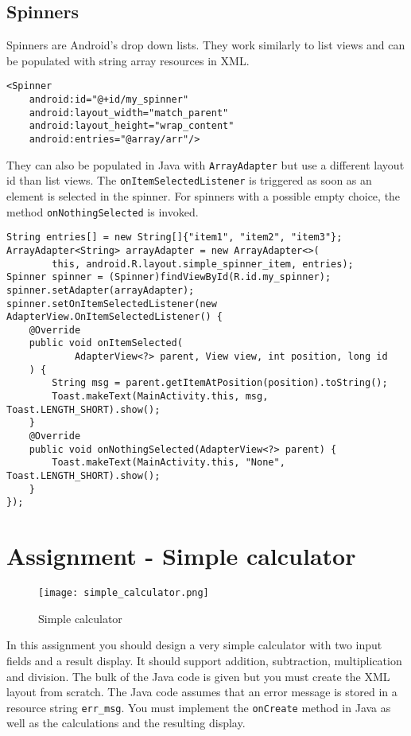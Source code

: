 \subsection{Spinners}
Spinners are Android's drop down lists. They work similarly to list views and can be populated with string array resources in XML.

\begin{lstlisting}[style=A_XML, caption={Spinner declaration}, label={listing:spinxml}]
<Spinner
    android:id="@+id/my_spinner"
    android:layout_width="match_parent"
    android:layout_height="wrap_content"
    android:entries="@array/arr"/>
\end{lstlisting}

They can also be populated in Java with \texttt{ArrayAdapter} but use a different layout id than list views. The \texttt{onItemSelectedListener} is triggered as soon as an element is selected in the spinner. For spinners with a possible empty choice, the method \texttt{onNothingSelected} is invoked.

\begin{lstlisting}[style=A_Java, caption={Spinner population and event}, label={listing:spinpopev}]
String entries[] = new String[]{"item1", "item2", "item3"};
ArrayAdapter<String> arrayAdapter = new ArrayAdapter<>(
        this, android.R.layout.simple_spinner_item, entries);
Spinner spinner = (Spinner)findViewById(R.id.my_spinner);
spinner.setAdapter(arrayAdapter);
spinner.setOnItemSelectedListener(new AdapterView.OnItemSelectedListener() {
    @Override
    public void onItemSelected(
            AdapterView<?> parent, View view, int position, long id
    ) {
        String msg = parent.getItemAtPosition(position).toString();
        Toast.makeText(MainActivity.this, msg, Toast.LENGTH_SHORT).show();
    }
    @Override
    public void onNothingSelected(AdapterView<?> parent) {
        Toast.makeText(MainActivity.this, "None", Toast.LENGTH_SHORT).show();
    }
});
\end{lstlisting}


\section{Assignment - Simple calculator}
\begin{minipage}{0.45\textwidth}
\begin{figure}[H]
\centering
\texttt{[image: simple\_calculator.png]}
\caption{Simple calculator}
\label{fig:simcal}
\end{figure}
\end{minipage}
\hfill
\begin{minipage}{0.475\textwidth}
In this assignment you should design a very simple calculator with two input fields and a result display. It should support addition, subtraction, multiplication and division. The bulk of the Java code is given but you must create the XML layout from scratch. The Java code assumes that an error message is stored in a resource string \texttt{err\_msg}. You must implement the \texttt{onCreate} method in Java as well as the calculations and the resulting display.
\end{minipage}

